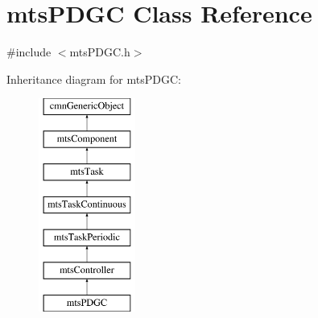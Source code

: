 \hypertarget{classmts_p_d_g_c}{\section{mts\-P\-D\-G\-C Class Reference}
\label{classmts_p_d_g_c}
}


{\ttfamily \#include $<$mts\-P\-D\-G\-C.\-h$>$}

Inheritance diagram for mts\-P\-D\-G\-C\-:\begin{figure}[H]
\begin{center}
\leavevmode
\includegraphics[height=7.000000cm]{df/d52/classmts_p_d_g_c}
\end{center}
\end{figure}
